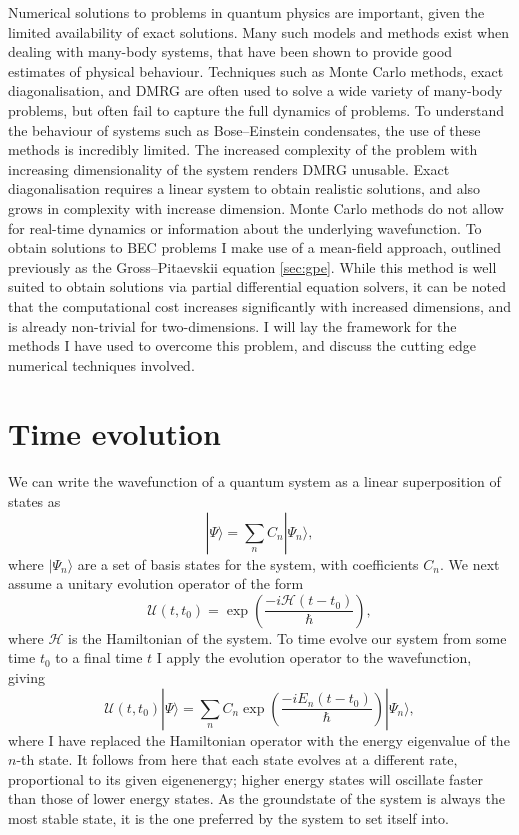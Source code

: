 Numerical solutions to problems in quantum physics are important, given the limited availability of exact solutions. Many such models and methods exist when dealing with many-body systems, that have been shown to provide good estimates of physical behaviour. Techniques such as Monte Carlo methods, exact diagonalisation, and DMRG are often used to solve a wide variety of many-body problems, but often fail to capture the full dynamics of problems. To understand the behaviour of systems such as Bose--Einstein condensates, the use of these methods is incredibly limited. The increased complexity of the problem with increasing dimensionality of the system renders DMRG unusable. Exact diagonalisation requires a linear system to obtain realistic solutions, and also grows in complexity with increase dimension. Monte Carlo methods do not allow for real-time dynamics or information about the underlying wavefunction. To obtain solutions to BEC problems I make use of a mean-field approach, outlined previously as the Gross--Pitaevskii equation \ref{sec:gpe}. While this method is well suited to obtain solutions via partial differential equation solvers, it can be noted that the computational cost increases significantly with increased dimensions, and is already non-trivial for two-dimensions. I will lay the framework for the methods I have used to overcome this problem, and discuss the cutting edge numerical techniques involved.


\section{Time evolution}
We can write the wavefunction of a quantum system as a linear superposition of states as
\begin{equation}
    |\Psi \rangle = \displaystyle\sum\limits_{n} C_n |\Psi_n \rangle,
\end{equation}
where $| \Psi_n \rangle$ are a set of basis states for the system, with coefficients $C_n$. We next assume a unitary evolution operator of the form
\begin{equation}
   \mathscr{U}(t,t_0) = \exp\left(\frac{-i\mathcal{H}(t-t_0)}{\hbar}\right),
\end{equation}
where $\mathcal{H}$ is the Hamiltonian of the system. To time evolve our system from some time $t_0$ to a final time $t$ I apply the evolution operator to the wavefunction, giving
\begin{equation}
   \mathscr{U}(t,t_0)|\Psi \rangle = \displaystyle\sum\limits_{n} C_n \exp\left(\frac{-i{E_n}(t-t_0)}{\hbar}\right)|\Psi_n \rangle,
\end{equation}
where I have replaced the Hamiltonian operator with the energy eigenvalue of the $n$-th state. It follows from here that each state evolves at a different rate, proportional to its given eigenenergy; higher energy states will oscillate faster than those of lower energy states. As the groundstate of the system is always the most stable state, it is the one preferred by the system to set itself into.

